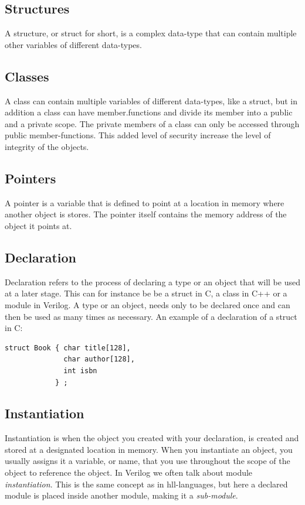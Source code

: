 \subsection{Structures}
A structure, or struct for short, is a complex data-type that can contain multiple other variables of different data-types. 
\subsection{Classes}
A class can contain multiple variables of different data-types, like a struct, but in addition a class can have member.functions and divide its member into a public and a private scope. The private members of a class can only be accessed through public member-functions. This added level of security increase the level of integrity of the objects.
\subsection{Pointers}
A pointer is a variable that is defined to point at a location in memory where another object is stores. The pointer itself contains the memory address of the object it points at.
\subsection{Declaration}
Declaration refers to the process of declaring a type or an object that will be used at a later stage. This can for instance be be a struct in C, a class in C++ or a module in Verilog. A type or an object, needs only to be declared once and can then be used as many times as necessary. An example of a declaration of a struct in C: 
\lstset{language=C++, style=Cstyle}
\begin{lstlisting}
struct Book { char title[128], 
              char author[128], 
              int isbn 
            } ;
\end{lstlisting}
\subsection{Instantiation}
Instantiation is when the object you created with your declaration, is created and stored at a designated location in memory. When you instantiate an object, you usually assigns it a variable, or name, that you use throughout the scope of the object to reference the object. In Verilog we often talk about module \textit{instantiation}. This is the same concept as in \gls{hll}-languages, but here a declared module is placed inside another module, making it a \textit{sub-module}.
